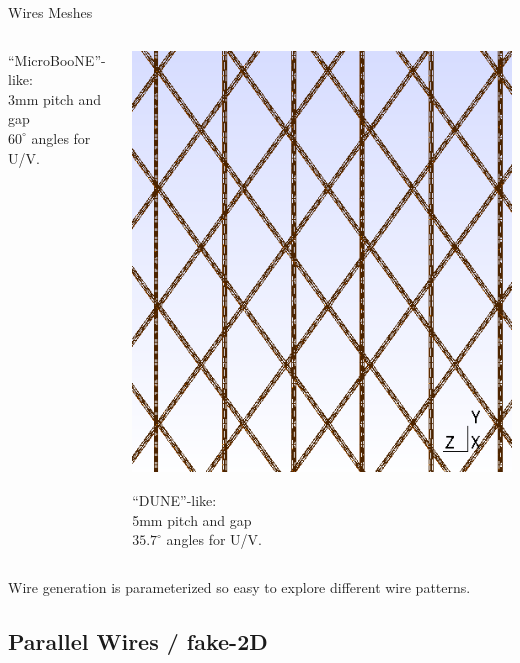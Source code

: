 \documentclass[xcolor=dvipsnames]{beamer}
\newcommand{\microboone}{MicroBooNE\xspace}
\begin{document}
\begin{frame}{Wires Meshes}
\begin{columns}
\begin{column}{0.3\textwidth}
\begin{center}
        ``\microboone''-like:\\3mm pitch and gap\\$60^\circ$ angles for U/V.
      \end{center}
    \end{column}
    \begin{column}{0.3\textwidth}
      \begin{center}
        \includegraphics[height=0.4\textheight]{dune-mesh.png}      

        ``DUNE''-like:\\5mm pitch and gap\\$35.7^\circ$ angles for U/V.
      \end{center}
    \end{column}
  \end{columns}

  \vfill

  Wire generation is parameterized so easy to explore different wire patterns.
\end{frame}

\subsection{Parallel Wires / fake-2D}
\end{document}
